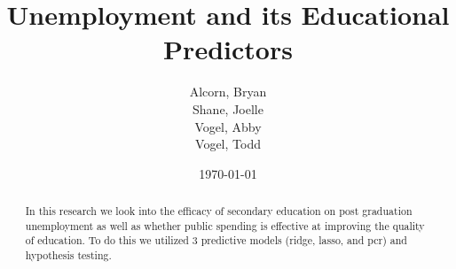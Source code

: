 \documentclass{article}
\begin{document}


\title{Unemployment and its Educational Predictors}
\author{
Alcorn, Bryan\\
Shane, Joelle\\
Vogel, Abby\\
Vogel, Todd\\
}
\date{\today}

\maketitle

\begin{abstract}
In this research we look into the efficacy of secondary education on post graduation unemployment as well as whether public spending is effective at improving the quality of education.  To do this we utilized 3 predictive models (ridge, lasso, and pcr) and hypothesis testing.
\end{abstract}
\end{document}
